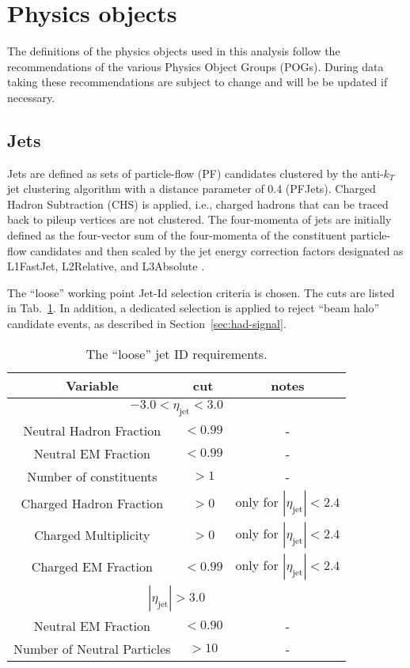 \section{Physics objects}
\label{sec:objects}
The definitions of the physics objects used in this analysis follow the recommendations of the various Physics Object Groups (POGs). 
During data taking these recommendations are subject to change and will be be updated if necessary.

\subsection{Jets}
\label{sec:jetreco}
Jets are defined as sets of particle-flow (PF) candidates clustered by the
anti-$k_{T}$ jet clustering algorithm \cite{Cacciari:2008gp} with a distance parameter of 0.4
(PFJets). Charged Hadron Subtraction (CHS) is applied, i.e., charged
hadrons that can be traced back to pileup vertices are not clustered.
The four-momenta of jets are initially defined as the four-vector sum of
the four-momenta of the constituent particle-flow candidates and then
scaled by the jet energy correction factors designated as L1FastJet,
L2Relative, and L3Absolute \cite{Chatrchyan:2011ds}.

The ``loose'' working point Jet-Id selection criteria is chosen. 
The cuts are listed in Tab.~\ref{tab:loose-jet-id}. 
In addition, a dedicated selection is applied to reject ``beam halo'' candidate events, 
as described in Section~\ref{sec:had-signal}.

\begin{table}[ht!]
  \caption{The ``loose'' jet ID requirements. \label{tab:loose-jet-id}}
  \centering
  \begin{tabular}{ ccc }
    \hline
    \hline
    Variable & cut & notes \\ \hline
    \multicolumn{3}{c}{$-3.0 < \eta_{\mathrm{jet}} < 3.0$} \\ \hline    
    Neutral Hadron Fraction & $<0.99$ & - \\
    Neutral EM Fraction & $<0.99$ & - \\
    Number of constituents & $>1$ & - \\
    Charged Hadron Fraction & $>0$ & only for $|\eta_{\mathrm{jet}}| < 2.4$ \\
    Charged Multiplicity & $>0$ & only for $|\eta_{\mathrm{jet}}| < 2.4$ \\
    Charged EM Fraction & $<0.99$ & only for $|\eta_{\mathrm{jet}}| < 2.4$ \\ \hline
    \multicolumn{3}{c}{$|\eta_{\mathrm{jet}}| > 3.0$} \\ \hline        
    Neutral EM Fraction & $<0.90$ & - \\
    Number of Neutral Particles & $>10$ & - \\
    \hline
    \hline
  \end{tabular}
\end{table}

